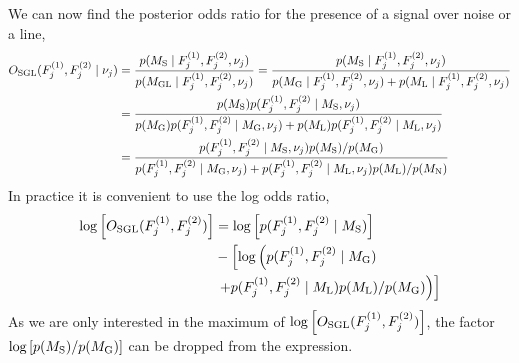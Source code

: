 %
We can now find the posterior odds ratio for the presence of a signal over noise or a line,
\begin{equation}
\label{soap:las:odds}
\begin{split}
O_{\rm{SGL}}(F^{(1)}_{j},F^{(2)}_{j}\mid\nu_j) &=  \frac{p(M_{\rm{S}} \mid F^{(1)}_{j},F^{(2)}_{j} ,\nu_j)}{p(M_{\rm{GL}} \mid F^{(1)}_{j},F^{(2)}_{j},\nu_j)}
= \frac{p(M_{\rm{S}} \mid F^{(1)}_{j},F^{(2)}_{j} ,\nu_j)}{p(M_{\rm{G}} \mid F^{(1)}_{j},F^{(2)}_{j} ,\nu_j) +p(M_{\rm{L}} \mid F^{(1)}_{j},F^{(2)}_{j} ,\nu_j)}\\
&=\frac{p(M_{\rm{S}})p(F^{(1)}_{j},F^{(2)}_{j} \mid M_{\rm{S}},\nu_j)}{p(M_{\rm{G}})p(F^{(1)}_{j},F^{(2)}_{j}\mid M_{\rm{G}},\nu_j) + p(M_{\rm{L}})p(F^{(1)}_{j},F^{(2)}_{j}\mid M_{\rm{L}},\nu_j) } \\
&= \frac{p(F^{(1)}_{j},F^{(2)}_{j} \mid M_{\rm{S}},\nu_j)p(M_{\rm{S}})/p(M_{\rm{G}})}{p(F^{(1)}_{j},F^{(2)}_{j}\mid M_{\rm{G}},\nu_j) + p(F^{(1)}_{j},F^{(2)}_{j}\mid M_{\rm{L}},\nu_j)p(M_{\rm{L}})/p(M_{\rm{N}}) }
\end{split}
\end{equation}
In practice it is convenient to use the log odds ratio,
\begin{equation}
\begin{split}
\label{soap:las:logodds}
\log\left[ O_{\rm{SGL}}(F^{(1)}_{j},F^{(2)}_{j})\right] &=  \log\left[ p(F^{(1)}_{j},F^{(2)}_{j} \mid M_{\rm{S}}) \right] \\
&- \left[ \log\left( p(F^{(1)}_{j},F^{(2)}_{j}\mid M_{\rm{G}}) \right. \right. \\
&\left.\left.+  p(F^{(1)}_{j},F^{(2)}_{j}\mid M_{\rm{L}})p(M_{\rm{L}})/p(M_{\rm{G}})\right) \right]
\end{split}
\end{equation}
As we are only interested in the maximum of $\log\left[ O_{\rm{SGL}}(F^{(1)}_{j},F^{(2)}_{j})\right]$, the factor $\log\left[ p(M_{\rm{S}})/p(M_{\rm{G}})\right]$ can be dropped from the expression.


